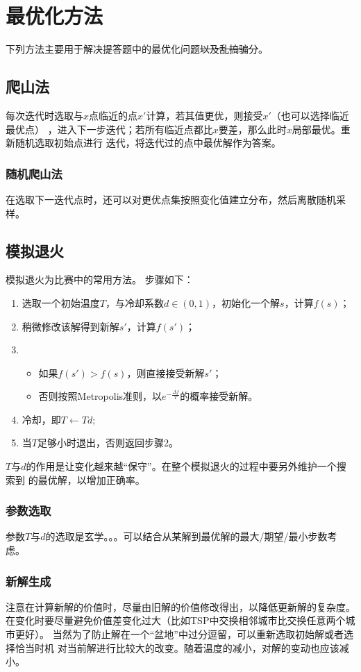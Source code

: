 \section{最优化方法}
下列方法主要用于解决提答题中的最优化问题\sout{以及乱搞骗分}。
\subsection{爬山法}
每次迭代时选取与$x$点临近的点$x'$计算，若其值更优，则接受$x'$（也可以选择临近最优点）
，进入下一步迭代；若所有临近点都比$x$要差，那么此时$x$局部最优。重新随机选取初始点进行
迭代，将迭代过的点中最优解作为答案。
\subsubsection{随机爬山法}
在选取下一迭代点时，还可以对更优点集按照变化值建立分布，然后离散随机采样。
\subsection{模拟退火}
模拟退火为比赛中的常用方法。
步骤如下：
\begin{enumerate}
	\item 选取一个初始温度$T$，与冷却系数$d\in (0,1)$，初始化一个解$s$，计算$f(s)$；
	\item 稍微修改该解得到新解$s'$，计算$f(s')$；
	\item \begin{itemize}
		      \item 如果$f(s')>f(s)$，则直接接受新解$s'$；
		      \item 否则按照Metropolis准则，以$e^{-\frac{\Delta f}{T}}$的概率接受新解。
	      \end{itemize}
	\item 冷却，即$T\leftarrow Td$;
	\item 当$T$足够小时退出，否则返回步骤2。
\end{enumerate}
$T$与$d$的作用是让变化越来越``保守''。在整个模拟退火的过程中要另外维护一个搜索到
的最优解，以增加正确率。

\subsubsection{参数选取}
参数$T$与$d$的选取是玄学。。。可以结合从某解到最优解的最大/期望/最小步数考虑。
\subsubsection{新解生成}
注意在计算新解的价值时，尽量由旧解的价值修改得出，以降低更新解的复杂度。
在变化时要尽量避免价值差变化过大（比如TSP中交换相邻城市比交换任意两个城市更好）。
当然为了防止解在一个``盆地''中过分逗留，可以重新选取初始解或者选择恰当时机
对当前解进行比较大的改变。随着温度的减小，对解的变动也应该减小。
